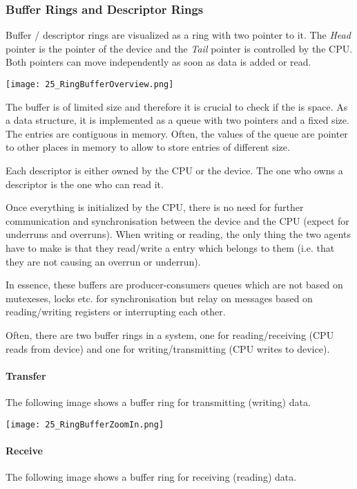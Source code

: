 \subsubsection{Buffer Rings and Descriptor Rings}
Buffer / descriptor rings are visualized as a ring with two pointer to it. The \textit{Head} pointer is the pointer of the device and the \textit{Tail} pointer is controlled by the CPU. Both pointers can move independently as soon as data is added or read.

\texttt{[image: 25\_RingBufferOverview.png]}

The buffer is of limited size and therefore it is crucial to check if the is space. As a data structure, it is implemented as a queue with two pointers and a fixed size. The entries are contiguous in memory. Often, the values of the queue are pointer to other places in memory to allow to store entries of different size.

Each descriptor is either owned by the CPU or the device. The one who owns a descriptor is the one who can read it.

Once everything is initialized by the CPU, there is no need for further communication and synchronisation between the device and the CPU (expect for underruns and overruns). When writing or reading, the only thing the two agents have to make is that they read/write a entry which belongs to them (i.e. that they are not causing an overrun or underrun).

In essence, these buffers are producer-consumers queues which are not based on mutexeses, locks etc. for synchronisation but relay on messages based on reading/writing registers or interrupting each other.

Often, there are two buffer rings in a system, one for reading/receiving (CPU reads from device) and one for writing/transmitting (CPU writes to device).

\paragraph{Transfer}
The following image shows a buffer ring for transmitting (writing) data.

\texttt{[image: 25\_RingBufferZoomIn.png]}

\paragraph{Receive}
The following image shows a buffer ring for receiving (reading) data.

